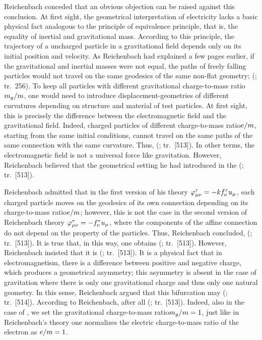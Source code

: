 \documentclass[submitted]{article}
\newcommand{\ctmr}{charge-to-mass ratio\xspace}
\newcommand{\ctmrf}{\ensuremath{\hfrac{e}{m}}\xspace}
\newcommand{\ctmrg}{\ensuremath{\hfrac{m_g}{m}}\xspace}
\newcommand{\RTo}{\ensuremath{\varphi\tmn=-k f^\tau_\nu u_\mu}\xspace}
\newcommand{\RTt}{\ensuremath{\varphi\tmn=-f^\tau_\nu u_\mu}\xspace}
\renewcommand{\me}{;~m.e.{}}
\renewcommand{\rzlp}[2]{(\cite[#1]{Reichenbach1928}; tr.\ #2)\xspace}
\renewcommand{\rzlap}[2]{(\cite[#1]{Reichenbach1928}; tr.\ [#2])\xspace}
\begin{document}
Reichenbach conceded that an obvious objection can be raised against this conclusion. At first sight, the geometrical interpretation of electricity lacks a basic physical fact analogous to the principle of equivalence principle, that is, the equality of inertial and gravitational mass. According to this principle, the trajectory of a uncharged particle in a gravitational field depends only on its initial position and velocity. As Reichenbach had explained a few pages earlier, if the gravitational and inertial masses were not equal, the paths of freely falling particles would not travel on the same geodesics of the same non-flat \spti geometry;  \rzlp{293\me}{256}. To keep all particles with different gravitational \ctmr \ctmrg, one would need to introduce displacement-geometries of different curvatures depending on structure and material of test particles. At first sight, this is precisely the difference between the electromagnetic field and the gravitational field. Indeed, charged particles of different \ctmr \ctmrf, starting from the same initial conditions, cannot travel on the same paths of the same connection with the same curvature. Thus,  \rzlap{367}{513}. In other terms, the electromagnetic field is not a universal force like gravitation. However, Reichenbach believed that the geometrical setting he had introduced in the \Ap {} \rzlap{367\me}{513}. 

Reichenbach admitted that in the first version of his theory \RTo, each charged particle moves on the geodesics of its own connection depending on its \ctmr \ctmrf; however, this is not the case in the second version of Reichenbach theory \RTt, where the components of the affine connection do not depend on the property of the particles. Thus, Reichenbach concluded,  \rzlap{367}{513}. It is true that, in this way, one obtains  \rzlap{367}{513}. However, Reichenbach insisted that it is  \rzlap{367}{513}. It is a physical fact that in electromagnetism, there is a difference between positive and negative charge, which produces a geometrical asymmetry; this asymmetry is absent in the case of gravitation where there is only one gravitational charge and thus only one natural geometry. In this sense, Reichenbach argued that this bifurcation may  \rzlap{367\me}{514}. According to Reichenbach, after all \rzlap{367}{513}. Indeed, also in the case of \gr, we set the gravitational \ctmr $\ctmrg=1$, just like in Reichenbach's theory one normalizes the electric \ctmr of the electron as $\ctmrf = 1$.
\end{document}
